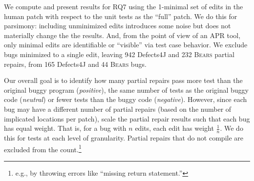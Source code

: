 \documentclass[10pt, conference]{IEEEtran}
\newcommand\bears{\textsc{Bears}\xspace}
\begin{document}
We compute and present results for RQ7 using the 1-minimal set of edits
in the human patch with respect to the unit tests as the ``full'' patch.  
We do this for parsimony: including
unminimized edits introduces some noise but does not materially change the
the results.  And, from the point of view of an APR tool, only
minimal edits are identifiable or ``visible'' via test case behavior. 
We exclude bugs
minimized to a single edit, leaving
942 Defects4J and 232 \bears partial repairs, from
165 Defects4J and 44 \bears bugs.  


Our overall goal is to identify how many partial repairs pass more test than the
original buggy program  (\emph{positive}), the  same number of tests as the
original buggy code (\emph{neutral}) or fewer tests than the buggy code
(\emph{negative}).  However, 
since each bug may have a different 
number of partial repairs (based on the number of implicated locations per
patch), scale the partial repair results such that each bug has equal weight.
That is, for a bug with $n$ edits, each edit has weight 
$\frac{1}{n}$. We do this for tests at each level of granularity.  Partial
repairs that do not compile are
excluded from the count.\footnote{e.g., by throwing errors like ``missing return statement.''}
\end{document}
